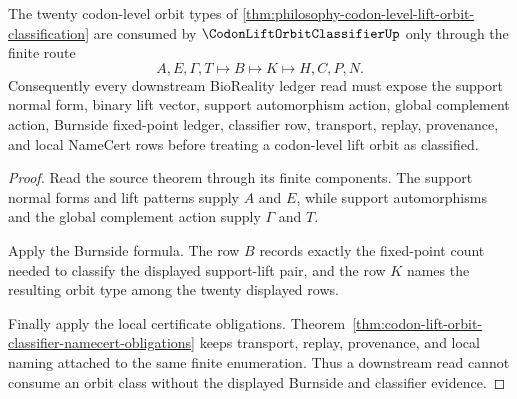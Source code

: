 \begin{theorem}
\label{thm:codon-lift-orbit-classifier-vision-landing}
The twenty codon-level orbit types of \autoref{thm:philosophy-codon-level-lift-orbit-classification} are consumed by $\CodonLiftOrbitClassifierUp$ only through the finite route
$$
A,E,\Gamma,T \longmapsto B \longmapsto K \longmapsto H,C,P,N .
$$
Consequently every downstream BioReality ledger read must expose the support normal form, binary lift vector, support automorphism action, global complement action, Burnside fixed-point ledger, classifier row, transport, replay, provenance, and local NameCert rows before treating a codon-level lift orbit as classified.
\end{theorem}
\begin{proof}
Read the source theorem through its finite components. The support normal forms and lift patterns supply $A$ and $E$, while support automorphisms and the global complement action supply $\Gamma$ and $T$.

Apply the Burnside formula. The row $B$ records exactly the fixed-point count needed to classify the displayed support-lift pair, and the row $K$ names the resulting orbit type among the twenty displayed rows.

Finally apply the local certificate obligations. Theorem~\ref{thm:codon-lift-orbit-classifier-namecert-obligations} keeps transport, replay, provenance, and local naming attached to the same finite enumeration. Thus a downstream read cannot consume an orbit class without the displayed Burnside and classifier evidence.
\end{proof}

